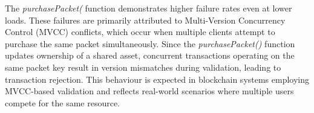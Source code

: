 \documentclass[12pt]{article}
\begin{document}
	
	\begin{table}[h]
		\centering
		\caption{Performance Results for \texttt{packLotIntoPackets} (Payload: 91 bytes) under Varying Load}
		
		
		\label{tab:pack-loadtest}
	\end{table}
	
	
	The \textit{purchasePacket(} function demonstrates higher failure rates even at lower loads. These failures are primarily attributed to Multi-Version Concurrency Control (MVCC) conflicts, which occur when multiple clients attempt to purchase the same packet simultaneously. Since the \textit{purchasePacket()} function updates ownership of a shared asset, concurrent transactions operating on the same packet key result in version mismatches during validation, leading to transaction rejection. This behaviour is expected in blockchain systems employing MVCC-based validation and reflects real-world scenarios where multiple users compete for the same resource.
	
\end{document}

